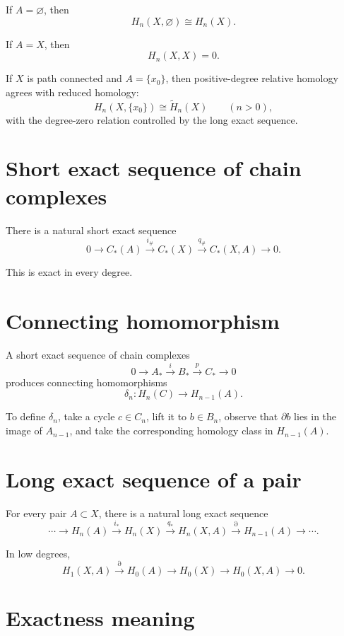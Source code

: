 If \(A=\varnothing\), then
\[
H_n(X,\varnothing)\cong H_n(X).
\]

If \(A=X\), then
\[
H_n(X,X)=0.
\]

If \(X\) is path connected and \(A=\{x_0\}\), then positive-degree relative
homology agrees with reduced homology:
\[
H_n(X,\{x_0\})\cong \widetilde H_n(X)
\qquad(n>0),
\]
with the degree-zero relation controlled by the long exact sequence.

\section{Short exact sequence of chain complexes}

There is a natural short exact sequence
\[
0
\longrightarrow
C_*(A)
\xrightarrow{i_\#}
C_*(X)
\xrightarrow{q_\#}
C_*(X,A)
\longrightarrow
0.
\]

This is exact in every degree.

\section{Connecting homomorphism}

A short exact sequence of chain complexes
\[
0\to A_*\xrightarrow{i}B_*\xrightarrow{p}C_*\to0
\]
produces connecting homomorphisms
\[
\delta_n:H_n(C)\to H_{n-1}(A).
\]

To define \(\delta_n\), take a cycle \(c\in C_n\), lift it to
\(b\in B_n\), observe that \(\partial b\) lies in the image of \(A_{n-1}\),
and take the corresponding homology class in \(H_{n-1}(A)\).

\section{Long exact sequence of a pair}

\begin{theorem}
\label{thm:viii19-les-pair}
For every pair \(A\subset X\), there is a natural long exact sequence
\[
\cdots
\to H_n(A)
\xrightarrow{i_*}
H_n(X)
\xrightarrow{q_*}
H_n(X,A)
\xrightarrow{\partial}
H_{n-1}(A)
\to\cdots.
\]
\end{theorem}

In low degrees,
\[
H_1(X,A)\xrightarrow{\partial}
H_0(A)\to H_0(X)\to H_0(X,A)\to0.
\]

\section{Exactness meaning}

